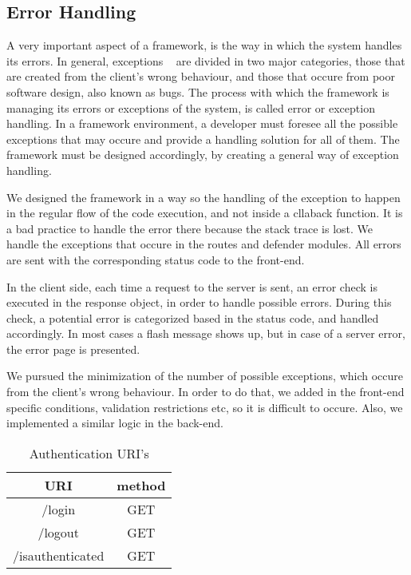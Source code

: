 \subsection{Error Handling}
A very important aspect of a framework, is the way in which the system handles its errors. In general, exceptions ~\cite{carlson2000method} are divided in two major categories, those that are created from the client's wrong behaviour, and those that occure from poor software design, also known as bugs. The process with which the framework is managing its errors or exceptions of the system, is called error or exception handling. In a framework environment, a developer must foresee all the possible exceptions that may occure and provide a handling solution for all of them. The framework must be designed accordingly, by creating a general way of exception handling. \par
	We designed the framework in a way so the handling of the exception to happen in the regular flow of the code execution, and not inside a cllaback function. It is a bad practice to handle the error there because the stack trace is lost. We handle the exceptions that occure in the routes and defender modules. All errors are sent with the corresponding status code to the front-end. \par 
	In the client side, each time a request to the server is sent, an error check is executed in the response object, in order to handle possible errors. During this check, a potential error is categorized based in the status code, and handled accordingly. In most cases a flash message shows up, but in case of a server error, the error page is presented. \par 
	We pursued the minimization of the number of possible exceptions, which occure from the client's wrong behaviour. In order to do that, we added in the front-end specific conditions, validation restrictions etc, so it is difficult to occure. Also, we implemented a similar logic in the back-end.

\begin{table}[]
\centering
\begin{tabular}{|c|c|}
\hline
\rowcolor[HTML]{32CB00} 
\textbf{URI}     & \textbf{method} \\ \hline
\rowcolor[HTML]{FFFFFF} 
/login           & GET             \\ \hline
\rowcolor[HTML]{67FD9A} 
/logout          & GET             \\ \hline
\rowcolor[HTML]{FFFFFF} 
/isauthenticated & GET             \\ \hline
\end{tabular}
\caption{Authentication URI's}
\label{authURI}
\end{table}


